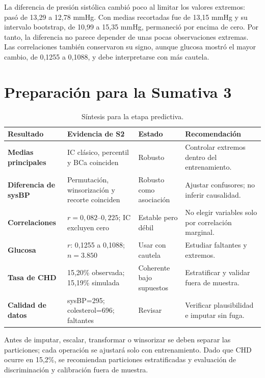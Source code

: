 \documentclass[10pt,a4paper]{article}
\begin{document}
La diferencia de presión sistólica cambió poco al limitar los valores
extremos: pasó de 13,29 a 12,78 mmHg. Con medias recortadas fue de 13,15
mmHg y su intervalo bootstrap, de 10,99 a 15,35 mmHg, permaneció por encima
de cero. Por tanto, la diferencia no parece depender de unas pocas
observaciones extremas. Las correlaciones también conservaron su signo,
aunque glucosa mostró el mayor cambio, de 0,1255 a 0,1088, y debe
interpretarse con más cautela.

\section{Preparación para la Sumativa 3}

\begin{table}[H]
\centering\scriptsize
\renewcommand{\arraystretch}{1.12}
\begin{tabularx}{\textwidth}{>{\bfseries}p{2.7cm} p{3.7cm} p{2.7cm} X}
\toprule
Resultado & Evidencia de S2 & Estado & Recomendación \\
\midrule
Medias principales & IC clásico, percentil y BCa coinciden & Robusto & Controlar extremos dentro del entrenamiento. \\
Diferencia de sysBP & Permutación, winsorización y recorte coinciden & Robusto como asociación & Ajustar confusores; no inferir causalidad. \\
Correlaciones & $r=0{,}082$--$0{,}225$; IC excluyen cero & Estable pero débil & No elegir variables solo por correlación marginal. \\
Glucosa & $r$: 0,1255 a 0,1088; $n=3.850$ & Usar con cautela & Estudiar faltantes y extremos. \\
Tasa de CHD & 15,20\% observada; 15,19\% simulada & Coherente bajo supuestos & Estratificar y validar fuera de muestra. \\
Calidad de datos & sysBP=295; colesterol=696; faltantes & Revisar & Verificar plausibilidad e imputar sin fuga. \\
\bottomrule
\end{tabularx}
\caption{Síntesis para la etapa predictiva.}
\end{table}

Antes de imputar, escalar, transformar o winsorizar se deben separar las
particiones; cada operación se ajustará solo con entrenamiento. Dado que CHD
ocurre en 15,2\%, se recomiendan particiones estratificadas y evaluación de
discriminación y calibración fuera de muestra.
\newpage

\end{document}
